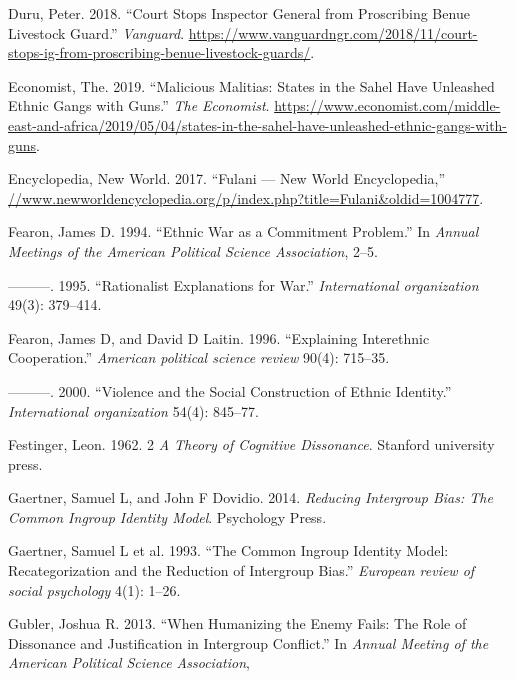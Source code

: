 \documentclass[11pt]{article}
\begin{document}
\leavevmode\hypertarget{ref-duru2018court}{}%
Duru, Peter. 2018. ``Court Stops Inspector General from Proscribing
Benue Livestock Guard.'' \emph{Vanguard}.
\url{https://www.vanguardngr.com/2018/11/court-stops-ig-from-proscribing-benue-livestock-guards/}.

\leavevmode\hypertarget{ref-economist2019militias}{}%
Economist, The. 2019. ``Malicious Malitias: States in the Sahel Have
Unleashed Ethnic Gangs with Guns.'' \emph{The Economist}.
\url{https://www.economist.com/middle-east-and-africa/2019/05/04/states-in-the-sahel-have-unleashed-ethnic-gangs-with-guns}.

\leavevmode\hypertarget{ref-fulanisize2017}{}%
Encyclopedia, New World. 2017. ``Fulani --- New World Encyclopedia,''
\url{//www.newworldencyclopedia.org/p/index.php?title=Fulani\&oldid=1004777}.

\leavevmode\hypertarget{ref-fearon1994ethnic}{}%
Fearon, James D. 1994. ``Ethnic War as a Commitment Problem.'' In
\emph{Annual Meetings of the American Political Science Association},
2--5.

\leavevmode\hypertarget{ref-fearon1995rationalist}{}%
---------. 1995. ``Rationalist Explanations for War.''
\emph{International organization} 49(3): 379--414.

\leavevmode\hypertarget{ref-fearon1996explaining}{}%
Fearon, James D, and David D Laitin. 1996. ``Explaining Interethnic
Cooperation.'' \emph{American political science review} 90(4): 715--35.

\leavevmode\hypertarget{ref-fearon2000violence}{}%
---------. 2000. ``Violence and the Social Construction of Ethnic
Identity.'' \emph{International organization} 54(4): 845--77.

\leavevmode\hypertarget{ref-festinger1962cognitiveDissonance}{}%
Festinger, Leon. 1962. 2 \emph{A Theory of Cognitive Dissonance}.
Stanford university press.

\leavevmode\hypertarget{ref-gaertner2014reducing}{}%
Gaertner, Samuel L, and John F Dovidio. 2014. \emph{Reducing Intergroup
Bias: The Common Ingroup Identity Model}. Psychology Press.

\leavevmode\hypertarget{ref-gaertner1993common}{}%
Gaertner, Samuel L et al. 1993. ``The Common Ingroup Identity Model:
Recategorization and the Reduction of Intergroup Bias.'' \emph{European
review of social psychology} 4(1): 1--26.

\leavevmode\hypertarget{ref-gubler2013humanizing}{}%
Gubler, Joshua R. 2013. ``When Humanizing the Enemy Fails: The Role of
Dissonance and Justification in Intergroup Conflict.'' In \emph{Annual
Meeting of the American Political Science Association},
\end{document}
